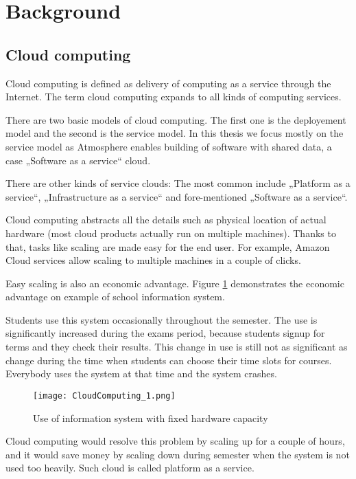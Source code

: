 \section{Background}

\subsection{Cloud computing}

Cloud computing is defined as delivery of computing as a service through the Internet. The term cloud computing expands to all kinds of computing services.

There are two basic models of cloud computing. The first one is the deployement model and the second is the service model. In this thesis we focus mostly on the service model as Atmosphere enables building of software with shared data, a case „Software as a service“ cloud. 

There are other kinds of service clouds: The most common include „Platform as a service“, „Infrastructure as a service“ and fore-mentioned „Software as a service“.

Cloud computing abstracts all the details such as physical location of actual hardware (most cloud products actually run on multiple machines). Thanks to that, tasks like scaling are made easy for the end user. For example, Amazon Cloud services allow scaling to multiple machines in a couple of clicks.

Easy scaling is also an economic advantage. Figure \ref{fig:1} demonstrates the economic advantage on example of school information system.

Students use this system occasionally throughout the semester. The use is significantly increased during the exams period, because students signup for terms and they check their results. This change in use is still not as significant as change during the time when students can choose their time slots for courses. Everybody uses the system at that time and the system crashes.

\begin{figure}[ht!]
\centering
\texttt{[image: CloudComputing\_1.png]}
\caption{Use of information system with fixed hardware capacity \label{fig:1}}
\end{figure}

Cloud computing would resolve this problem by scaling up for a couple of hours, and it would save money by scaling down during semester when the system is not used too heavily. Such cloud is called platform as a service.

